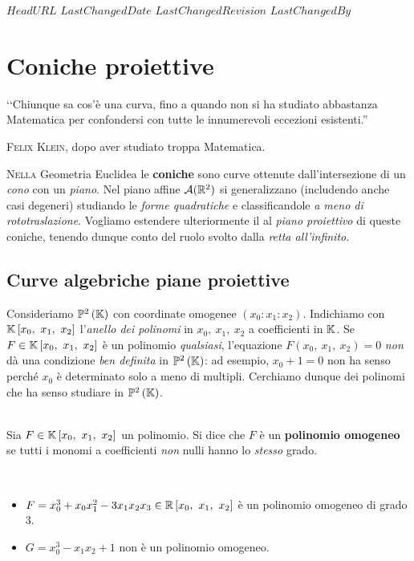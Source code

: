\svnidlong
{$HeadURL$}
{$LastChangedDate$}
{$LastChangedRevision$}
{$LastChangedBy$}

\chapter{Coniche proiettive}

\begin{introduction}
	‘‘Chiunque sa cos'è una curva, fino a quando non si ha studiato abbastanza Matematica per confondersi con tutte le innumerevoli eccezioni esistenti.''
	\begin{flushright}
		\textsc{Felix Klein,} dopo aver studiato troppa Matematica.
	\end{flushright}
\end{introduction}
\lettrine[findent=1pt, nindent=0pt]{N}{ella} Geometria Euclidea le \textbf{coniche} sono curve ottenute dall'intersezione di un \textit{cono} con un \textit{piano}. Nel piano affine $\mathcal{A}(\mathbb{R}^2)$ si generalizzano (includendo anche casi degeneri) studiando le \textit{forme quadratiche} e classificandole \textit{a meno di rototraslazione}. Vogliamo estendere ulteriormente il al \textit{piano proiettivo} di queste coniche, tenendo dunque conto del ruolo svolto dalla \textit{retta all'infinito}.
\section{Curve algebriche piane proiettive}
Consideriamo $\proj[2]{\kamp}$ con coordinate omogenee $(x_0\colon x_1\colon x_2)$. Indichiamo con $\kamp\left[x_0,\ x_1,\ x_2\right]$ l'\textit{anello dei polinomi} in $x_0,\ x_1,\ x_2$ a coefficienti in $\mathbb{K}$. Se $F\in\kamp\left[x_0,\ x_1,\ x_2\right]$ è un polinomio \textit{qualsiasi}, l'equazione $F(x_0,\ x_1,\ x_2)=0$ \textit{non} dà una condizione \textit{ben definita} in $\proj[2]{\kamp}$: ad esempio, $x_0+1=0$ non ha senso perché $x_0$ è determinato solo a meno di multipli. Cerchiamo dunque dei polinomi che ha senso studiare in $\proj[2]{\kamp}$.
\begin{define}~{}\\
Sia $F\in\kamp\left[x_0,\ x_1,\ x_2\right]$ un polinomio. Si dice che $F$ è un \textbf{polinomio omogeneo} se tutti i monomi a coefficienti \textit{non} nulli hanno lo \textit{stesso} grado.
\end{define}
\begin{examples}~{}
	\begin{itemize}
		\item $F=x_0^3+x_0x_1^2-3x_1x_2x_3\in\realset\left[x_0,\ x_1,\ x_2\right]$ è un polinomio omogeneo di grado $3$.
		\item $G=x_0^3-x_1x_2+1$ non è un polinomio omogeneo.
	\end{itemize}
\vspace{-3mm}
\end{examples}

